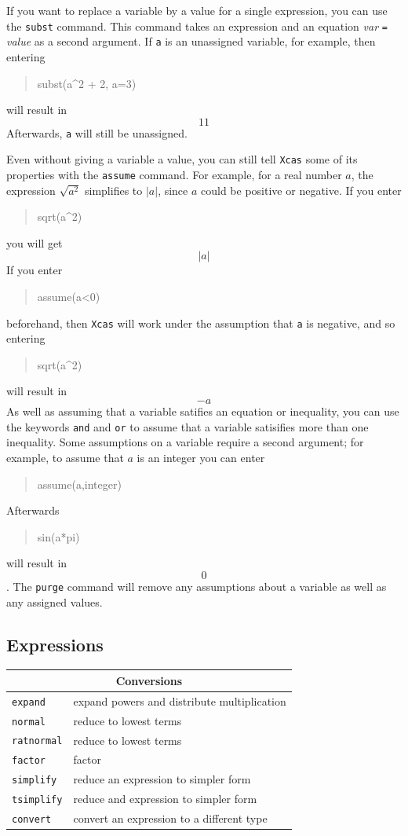 \documentclass{article}
\newcommand{\xcasin}[1]
{\begin{quote}\ttfamily
#1
\end{quote}}
\newcommand{\xcasout}[1]
{\begin{equation*}
#1
\end{equation*}}
\begin{document}
If you want to replace a variable by a value for a single expression,
you can use the \texttt{subst} command.  This command takes an
expression and an equation \textit{var} \texttt{=} \textit{value} as a
second argument.  If \texttt{a} is an unassigned variable, for example, then
entering
\xcasin{subst(a\^{}2 + 2, a=3)}
will result in
\xcasout{11}
Afterwards, \texttt{a} will still be unassigned.

Even without giving a variable a value, you can still tell
\texttt{Xcas} some of its properties with the \texttt{assume} command.
For example, for a real number $a$, the expression $\sqrt{a^2}$
simplifies to $|a|$, since $a$ could be positive or negative.  If you
enter 
\xcasin{sqrt(a\^{}2)}
you will get
\xcasout{|a|}
If you enter 
\xcasin{assume(a<0)}
beforehand, then \texttt{Xcas} will work under the assumption that
\texttt{a} is negative, and so entering
\xcasin{sqrt(a\^{}2)}
will result in
\xcasout{-a}
As well as assuming that a variable satifies an equation or
inequality, you can use the keywords \texttt{and} and \texttt{or} to
assume that a variable satisifies more than one inequality.  Some
assumptions on a variable require a second argument; for example, to
assume that $a$ is an integer you can enter
\xcasin{assume(a,integer)}
Afterwards
\xcasin{sin(a*pi)}
will result in 
\xcasout{0}.
The \texttt{purge} command will remove any assumptions about a
variable as well as any assigned values.


\subsection{Expressions}

\begin{center}
\begin{tabular}{|p{}|p{}|}
\hline
\multicolumn{2}{|c|}{\textbf{Conversions}}\\
\hline\hline
\texttt{expand}  &  expand powers and distribute multiplication  \\
\texttt{normal}   & reduce to lowest terms\\
\texttt{ratnormal}   & reduce to lowest terms\\
\texttt{factor}   &  factor\\
\texttt{simplify}   & reduce an expression to simpler form\\
\texttt{tsimplify}   & reduce and expression to simpler form\\
\texttt{convert}   & convert an expression to a different type\\
\hline
\end{tabular}
\end{center}
\end{document}
